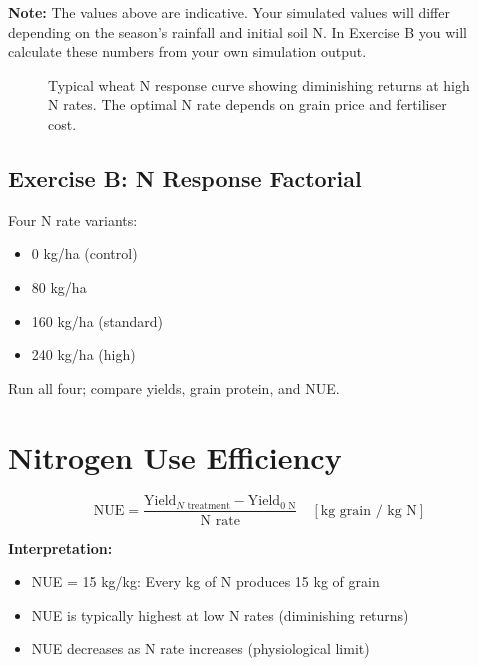 \begin{tipbox}
\textbf{Note:} The values above are indicative. Your simulated values will differ depending on the season's rainfall and initial soil N. In Exercise B you will calculate these numbers from your own simulation output.
\end{tipbox}

\begin{figure}[H]
  \centering
  \caption{Typical wheat N response curve showing diminishing returns at high N rates. The optimal N rate depends on grain price and fertiliser cost.}
  \label{fig:n-response-curve}
\end{figure}

\subsection{Exercise B: N Response Factorial}

Four N rate variants:
\begin{itemize}
  \item 0 kg/ha (control)
  \item 80 kg/ha
  \item 160 kg/ha (standard)
  \item 240 kg/ha (high)
\end{itemize}

Run all four; compare yields, grain protein, and NUE.

\section{Nitrogen Use Efficiency}

\[
\text{NUE} = \frac{\text{Yield}_{N \text{ treatment}} - \text{Yield}_{0 \text{ N}}}{\text{N rate}} \quad [\text{kg grain / kg N}]
\]

\begin{keyconceptbox}
\textbf{Interpretation:}
\begin{itemize}
  \item NUE = 15 kg/kg: Every kg of N produces 15 kg of grain
  \item NUE is typically highest at low N rates (diminishing returns)
  \item NUE decreases as N rate increases (physiological limit)
\end{itemize}
\end{keyconceptbox}

